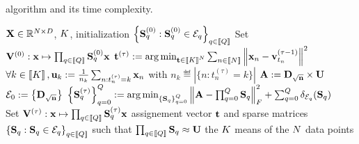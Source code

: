 \begin{algorithm}[t]
	\caption{\qkmeans algorithm and its time complexity.}
	\label{algo:qmeans}
	\begin{algorithmic}[1]
\REQUIRE ${\mathbf{X}} \in \mathbb{R}^{N \times D}$, $K$, initialization $\left \lbrace {\mathbf{S}}_q^{(0)} : {\mathbf{S}}_q^{(0)} \in \mathcal{E}_q\right \rbrace_{q\in\left \llbracket Q\right \rrbracket}$
\STATE Set ${\mathbf{V}}^{(0)} : {\mathbf{x}} \mapsto \prod_{q\in\left \llbracket Q\right \rrbracket}{{\mathbf{S}}_q^{(0)}} {\mathbf{x}}$
	\STATE ${\mathbf{t}}^{(\tau)} := \operatorname*{arg\,min}_{{\mathbf{t}} \in \left \llbracket K\right \rrbracket^N} \sum_{n\in\left \llbracket N\right \rrbracket} {\left \|{\mathbf{x}}_n - {\mathbf{v}}^{(\tau -1)}_{t_n}\right \|^2}$
	\label{line:qmeans:assignment}
	\STATE $\forall k\in\left \llbracket K\right \rrbracket, {\mathbf{u}}_k := \frac{1}{n_k} \sum_{n: t_n^{(\tau)}= k} {{\mathbf{x}}_n}$
with $n_k \eqdef |\{n: t_n^{(\tau)}=k\}|$
	\COMMENT{$\bigO{\nexamples\datadim}$}
	\label{line:qmeans:compute_means}
	\STATE ${\mathbf{A}} := {\mathbf{D}}_{\sqrt{{\mathbf{n}}}} \times {\mathbf{U}} $
	\COMMENT{$\bigO{\nclusters\datadim}$}
	\label{line:qmeans:A}
	\STATE $\mathcal{E}_0 := \left \lbrace {\mathbf{D}}_{\sqrt{{\mathbf{n}}}} \right \rbrace$
	\label{line:qmeans:E0}
	\STATE $\left \lbrace {\mathbf{S}}_q^{(\tau)}\right \rbrace_{q=0}^Q := \operatorname*{arg\,min}_{\left \lbrace {\mathbf{S}}_q\right \rbrace_{q=0}^Q} \left \|{\mathbf{A}} - \prod_{q=0}^Q{\mathbf{S}}_q\right \|_F^2 + \sum_{q=0}^Q \delta_{\mathcal{E}_q}({\mathbf{S}}_q)$\\
	\label{line:qmeans:S}
	\STATE Set ${\mathbf{V}}^{(\tau)} : {\mathbf{x}} \mapsto \prod_{q\in\left \llbracket Q\right \rrbracket}{{\mathbf{S}}_q^{(\tau)}} {\mathbf{x}}$
	\label{line:qmeans:U}
	\ENDFOR
	\ENSURE assignement vector ${\mathbf{t}}$ and sparse matrices $\left \lbrace {\mathbf{S}}_q : {\mathbf{S}}_q \in \mathcal{E}_q\right \rbrace_{q\in\left \llbracket Q\right \rrbracket}$ such that $\prod_{q\in\left \llbracket Q\right \rrbracket}{\mathbf{S}}_q \approx {\mathbf{U}}$ the $K$ means of the $N$ data points
\end{algorithmic}
\end{algorithm}

%
%

